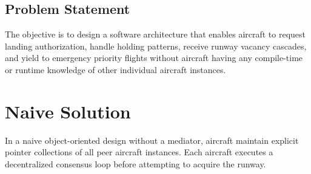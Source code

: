 \documentclass[12pt,a4paper]{article}
\begin{document}
\subsection{Problem Statement}
The objective is to design a software architecture that enables aircraft to request landing authorization, handle holding patterns, receive runway vacancy cascades, and yield to emergency priority flights without aircraft having any compile-time or runtime knowledge of other individual aircraft instances.

\newpage
\section{Naive Solution}

In a naive object-oriented design without a mediator, aircraft maintain explicit pointer collections of all peer aircraft instances. Each aircraft executes a decentralized consensus loop before attempting to acquire the runway.
\end{document}
